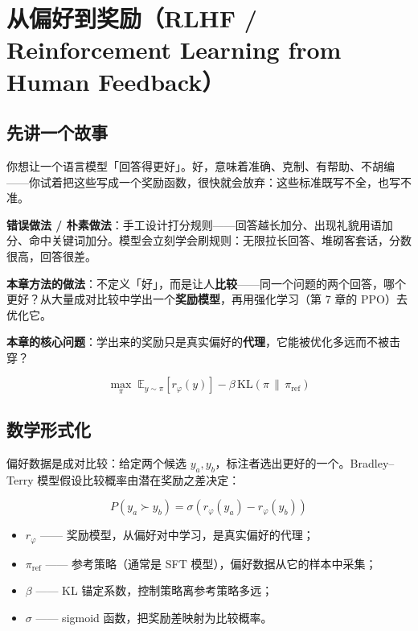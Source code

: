 \documentclass{article}
\begin{document}
\section*{从偏好到奖励（RLHF / Reinforcement Learning from Human Feedback）}

\subsection*{先讲一个故事}

你想让一个语言模型「回答得更好」。好，意味着准确、克制、有帮助、不胡编——你试着把这些写成一个奖励函数，很快就会放弃：这些标准既写不全，也写不准。

\textbf{错误做法 / 朴素做法}：手工设计打分规则——回答越长加分、出现礼貌用语加分、命中关键词加分。模型会立刻学会刷规则：无限拉长回答、堆砌客套话，分数很高，回答很差。

\textbf{本章方法的做法}：不定义「好」，而是让人\textbf{比较}——同一个问题的两个回答，哪个更好？从大量成对比较中学出一个\textbf{奖励模型}，再用强化学习（第 7 章的 PPO）去优化它。

\textbf{本章的核心问题}：学出来的奖励只是真实偏好的\textbf{代理}，它能被优化多远而不被击穿？

\[
\boxed{\max_{\pi}\; \mathbb{E}_{y\sim\pi}\left[r_{\varphi}(y)\right] - \beta\,\mathrm{KL}\!\left(\pi \,\|\, \pi_{\mathrm{ref}}\right)}
\]

\subsection*{数学形式化}

偏好数据是成对比较：给定两个候选 $y_a, y_b$，标注者选出更好的一个。Bradley--Terry 模型假设比较概率由潜在奖励之差决定：

\[
\boxed{P(y_a \succ y_b) = \sigma\!\left(r_{\varphi}(y_a) - r_{\varphi}(y_b)\right)}
\]

\begin{itemize}
  \item $r_{\varphi}$ —— 奖励模型，从偏好对中学习，是真实偏好的代理；
  \item $\pi_{\mathrm{ref}}$ —— 参考策略（通常是 SFT 模型），偏好数据从它的样本中采集；
  \item $\beta$ —— KL 锚定系数，控制策略离参考策略多远；
  \item $\sigma$ —— sigmoid 函数，把奖励差映射为比较概率。
\end{itemize}

\end{document}
